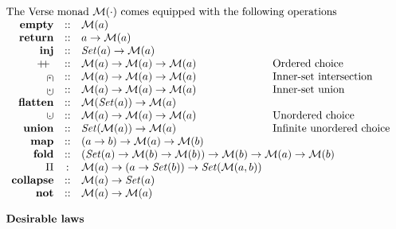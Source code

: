 
\begin{figure}
$$
\begin{array}{l}
\text{The Verse monad $\Vm{\cdot}$ comes equipped with the following operations} \\
  \begin{array}{rcll}
    \vmempty & :: & \Vm{a} \\
    \vmreturn & :: & a \rightarrow \Vm{a} \\
    \vminject & :: & \powerset{a} \rightarrow \Vm{a} \\
    \vmcat    & :: & \Vm{a} \rightarrow \Vm{a} \rightarrow \Vm{a} & \text{Ordered choice} \\
    \vmseq    & :: & \Vm{a} \rightarrow \Vm{a} \rightarrow \Vm{a} & \text{Inner-set intersection}\\
    \vminnerunion  & :: & \Vm{a} \rightarrow \Vm{a} \rightarrow \Vm{a} & \text{Inner-set union} \\
    \vmflatten & :: & \Vm{\powerset{a}} \rightarrow \Vm{a} \\
    \vmunion  & :: & \Vm{a} \rightarrow \Vm{a} \rightarrow \Vm{a} & \text{Unordered choice}\\
    \vmunions & :: & \powerset{\Vm{a}} \rightarrow \Vm{a}  & \text{Infinite unordered choice} \\
    \vmmap    & :: & (a \rightarrow b) \rightarrow \Vm{a} \rightarrow \Vm{b} \\
    \vmfold   & :: & \multicolumn{2}{l}{(\powerset{a} \rightarrow \Vm{b} \rightarrow \Vm{b})
                          \rightarrow \Vm{b} \rightarrow \Vm{a} \rightarrow \Vm{b}} \\
    \vmpi & : & \Vm{a} \rightarrow (a \rightarrow \powerset{b}) \rightarrow \powerset{\Vm{a,b}} \\
    \vmcollapse & :: & \Vm{a} \rightarrow \powerset{a} \\
    \vmnot      & :: & \Vm{a} \rightarrow \Vm{a}
  \end{array}
  \\ \\
  \textbf{Desirable laws} \\
  \begin{array}{rclcl}

\end{array}
\end{array}$$
\end{figure}
